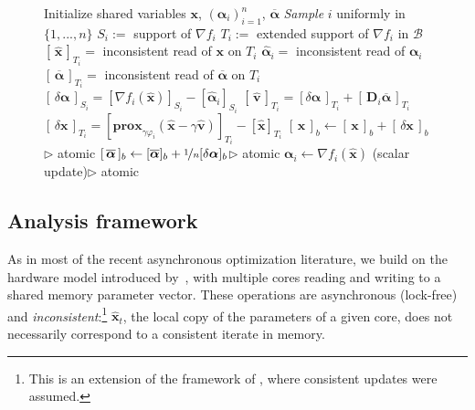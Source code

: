 \documentclass{article}
\def\prox{{\mathbf{prox}}}
\def\xx{{\boldsymbol x}}
\def\vv{{\boldsymbol v}}
\def\DD{{\boldsymbol D}}
\def\balpha{{\boldsymbol \alpha}}
\renewcommand{\llbracket}{[}
\renewcommand{\rrbracket}{]}
\begin{document}
\begin{figure*}[ttt!]
\begin{minipage}[t]{0.5\textwidth}
\begin{algorithm}[H]
\begin{algorithmic}[1]
     \STATE Initialize shared variables $\xx$, $({\boldsymbol\alpha}_i)_{i=1}^n$, $\overline{\balpha}$
     \LOOP
     \STATE \emph{Sample} $i$ uniformly in $\{1,...,n\}$
     \STATE $S_i :=$ support of $\nabla f_i$
     \STATE $T_i :=$ extended support of $\nabla f_i$ in $\mathcal{B}$
     \STATE $\llbracket\,\hat \xx\,\rrbracket_{T_i} = $ inconsistent read of $\xx$ on $T_i$
     \STATE $\hat {\boldsymbol\alpha}_i = $ inconsistent read of ${\boldsymbol\alpha}_i$
     \STATE $\llbracket\,\overline{\boldsymbol\alpha}\,\rrbracket_{T_i} = $ inconsistent read of $\overline{\boldsymbol\alpha}$ on $T_i$
     \STATE $\llbracket\,\delta\balpha\,\rrbracket_{S_i} = \llbracket\nabla f_i(\hat \xx)\rrbracket_{S_i} - \llbracket\hat{{\boldsymbol\alpha}}_i\rrbracket_{S_i}$
     \STATE $\llbracket\,\hat \vv\,\rrbracket_{T_i} = \llbracket\delta \balpha\,\rrbracket_{T_i} + \llbracket\,\DD_i \overline {\boldsymbol\alpha}\,\rrbracket_{T_i}$
     \STATE $\llbracket\,\delta\xx\,\rrbracket_{T_i} = \llbracket\prox_{\gamma \varphi_i}(\hat{\xx} - \gamma \hat \vv)\rrbracket_{T_i} - \llbracket\hat\xx\rrbracket_{T_i}$
     \STATE $[\,\xx\,]_b \gets [\,\xx\,]_b + [\,\delta\xx\,]_b$\hfill$\triangleright$ atomic
      \STATE $[\,\overline {\boldsymbol\alpha}\,]_b \gets [\overline {\boldsymbol\alpha}]_b + \nicefrac{1}{n}[\delta {\boldsymbol\alpha}]_b$\hfill$\triangleright$ atomic
     \ENDIF
     \ENDFOR
     \ENDFOR
     \STATE ${\boldsymbol\alpha}_i \gets \nabla f_i(\hat\xx)$  \quad  (scalar update)\hfill$\triangleright$ atomic\label{line:alphaiupdate}
     \ENDLOOP
      \end{algorithmic}
    \end{algorithm}
 \end{minipage}
\end{figure*}

\subsection{Analysis framework}
As in most of the recent asynchronous optimization literature, we build on the hardware model introduced by~\citet{hogwild2011}, with multiple cores reading and writing to a shared memory parameter vector.
These operations are asynchronous (lock-free) and \textit{inconsistent}:\footnote{This is an extension of the framework of \citet{hogwild2011}, where consistent updates were assumed.} $\hat \xx_t$, the local copy of the parameters of a given core, does not necessarily correspond to a consistent iterate in memory.
\end{document}
